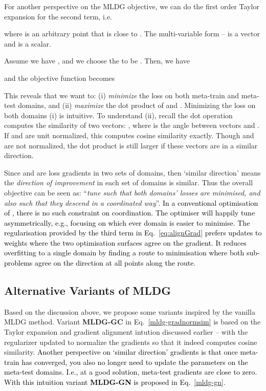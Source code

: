 \documentclass[letterpaper]{article} \usepackage{aaai18}  \usepackage{times}  \usepackage{helvet}  \usepackage{courier}  \usepackage{url}  \usepackage{graphicx}  \usepackage{amsmath}
\begin{document}
{For another perspective on the MLDG objective, we can do the first order Taylor expansion for the second term, i.e. 

where  is an arbitrary point that is close to . The multi-variable form –  is a vector and  is a scalar.

Assume we have , and we choose the  to be . Then, we have 


\noindent and the objective function becomes 




This reveals that we want to: (i) \textit{minimize} the loss on both meta-train and meta-test domains, and (ii) \textit{maximize} the dot product of  and . Minimizing the loss on both domains (i) is intuitive. To understand (ii), recall the dot operation computes the similarity of two vectors: , where  is the angle between  vectors  and . If  and  are unit normalized, this computes cosine similarity exactly. Though  and  are not normalized, the dot product is still larger if these vectors are in a {similar direction}. 

Since  and  are loss gradients in two sets of domains, then `similar direction' means the \emph{direction of improvement} in each set of domains is similar. Thus the overall objective can be seen as: ``\emph{tune such that both domains' losses are minimised, and also such that they descend in a coordinated way}''. \textcolor{black}{In a conventional optimisation of , there is no such constraint on coordination. The optimiser will happily tune asymmetrically, e.g., focusing on which ever domain is easier to minimise.} \textcolor{black}{The regularisation provided by the third term in  Eq.~\ref{eq:alignGrad}  prefers updates to weights where the two optimisation surfaces agree on the gradient. It reduces overfitting to a single domain by finding a route to minimisation where both sub-problems agree on the direction at all points along the route}.



\subsection{Alternative Variants of MLDG}
Based on the discussion above, we propose some variants inspired by the vanilla MLDG method. 
Variant \textbf{MLDG-GC} in Eq.~\ref{mldg-gradnormsim} is based on the Taylor expansion and gradient alignment intution discussed earlier -- with the regularizer updated to normalize the gradients so that it indeed computes cosine similarity. 
\textcolor{black}{Another perspective on `similar direction' gradients is that once meta-train has converged, you also no longer need to update the parameters on the meta-test domains. I.e., at a good solution, meta-test gradients are close to zero. With this intuition variant \textbf{MLDG-GN} is proposed in Eq.~\ref{mldg-gn}.}

}
\end{document}
